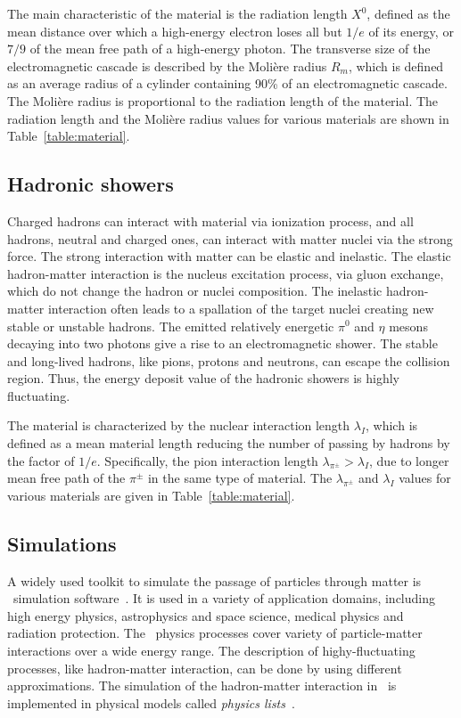 The main characteristic of the material is the radiation length $X^0$, defined as the mean distance over which a high-energy electron loses all but $1/e$ of its energy, or $7/9$ of the mean free path of a high-energy photon. 
The transverse size of the electromagnetic cascade is described by the Moli\`ere radius $R_{m}$, which is defined as an average radius of a cylinder containing 90\% of an electromagnetic cascade. The Moli\`ere radius is proportional to the radiation length of the material. 
The radiation length and the Moli\`ere radius values for various materials are shown in Table~\ref{table:material}.


\subsection{Hadronic showers}
Charged hadrons can interact with material via ionization process, and all hadrons, neutral and charged ones, can interact with matter nuclei via the strong force.
The strong interaction with matter can be elastic and inelastic. 
The elastic hadron-matter interaction is the nucleus excitation process, via gluon exchange, which do not change the hadron or nuclei composition. 
The inelastic hadron-matter interaction often leads to a spallation of the target nuclei creating new stable or unstable hadrons. 
The emitted relatively energetic  $\pi^0$ and $\eta$ mesons decaying into two photons give a rise to an electromagnetic shower. 
The stable and long-lived hadrons, like pions, protons and neutrons, can escape the collision region. 
Thus, the energy deposit value of the hadronic showers is highly fluctuating. 

The material is characterized by the nuclear interaction length $\lambda_{I}$, which is defined as a mean material length reducing the number of passing by hadrons by the factor of $1/e$. 
Specifically, the pion interaction length $\lambda_{\pi^\pm} > \lambda_{I}$, due to longer mean free path of the $\pi^\pm$ in the same type of material. 
The   $\lambda_{\pi^\pm} $ and $ \lambda_{I}$ values for various materials are given in Table~\ref{table:material}.
\subsection{Simulations}
A widely used toolkit to simulate the passage of particles through matter is \geant\ simulation software~\cite{Allison:2006ve}. 
It is used in a variety of application domains, including high energy physics, astrophysics and space science, medical physics and radiation protection. 
The \geant\ physics processes cover variety of particle-matter interactions over a wide energy range.
The description of highy-fluctuating processes, like hadron-matter interaction, can be done by using different approximations. 
The simulation of the hadron-matter interaction in \geant\ is implemented in physical models called \textit{physics lists}~\cite{bib:G4pl}.

